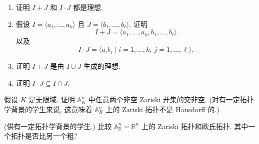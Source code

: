 \begin{BookExercises}
\begin{enumerate}[label=(\alph*)]
      \item 证明 $I+J$ 和 $I\cdot J$ 都是理想.
      \item 假设 $I=\langle a_{1},\ldots,a_{k}\rangle$ 且 $J=\langle b_{1},\ldots,b_{\ell}\rangle$. 证明
        \[
          I+J=\langle a_{1},\ldots,a_{k},b_{1},\ldots,b_{\ell}\rangle
        \]
        以及
        \[
          I\cdot J=\langle a_{i}b_{j}\mid i=1,\ldots,k,\ j=1,\ldots,\ell\rangle.
        \]
      \item 证明 $I+J$ 是由 $I\cup J$ 生成的理想.
      \item 证明 $I\cdot J\subseteq I\cap J$.
    \end{enumerate}
  \item\label{ex:nonempty-zariski-opens-intersect} 假设 $K$ 是无限域. 证明 $\mathbb{A}^{n}_{K}$ 中任意两个非空 Zariski 开集的交非空. (对有一定拓扑学背景的学生来说, 这意味着 $\mathbb{A}^{n}_{K}$ 上的 Zariski 拓扑不是 Hausdorff 的.)
  \item\label{ex:compare-zariski-and-euclidean-topologies} (供有一定拓扑学背景的学生.) 比较 $\mathbb{A}^{n}_{\mathbb{R}}=\mathbb{R}^{n}$ 上的 Zariski 拓扑和欧氏拓扑. 其中一个拓扑是否比另一个粗?
\end{BookExercises}
